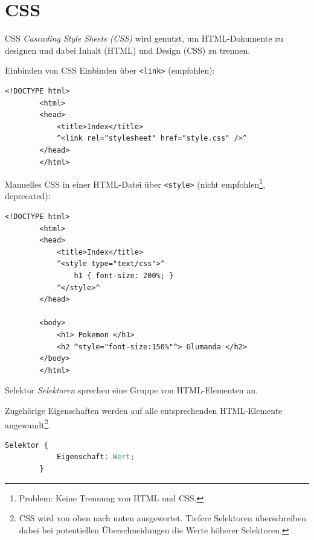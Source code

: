\section{CSS}

\begin{defi}{CSS}
    \emph{Cascading Style Sheets (CSS)} wird genutzt, um HTML-Dokumente zu designen und dabei Inhalt (HTML) und Design (CSS) zu trennen.
\end{defi}

\begin{example}{Einbinden von CSS}
    Einbinden über \texttt{<link>} (empfohlen):
    \begin{lstlisting}[language=html5]
        <!DOCTYPE html>
        <html>
        <head>
            <title>Index</title>
            ^<link rel="stylesheet" href="style.css" />^
        </head>
        </html>
    \end{lstlisting}

    Manuelles CSS in einer HTML-Datei über \texttt{<style>} (nicht empfohlen\footnote{Problem: Keine Trennung von HTML und CSS.}, deprecated):
    \begin{lstlisting}[language=html5]
        <!DOCTYPE html>
        <html>
        <head>
            <title>Index</title>
            ^<style type="text/css">^
                h1 { font-size: 200%; }
            ^</style>^
        </head>

        <body>
            <h1> Pokemon </h1>
            <h2 ^style="font-size:150%"^> Glumanda </h2>
        </body>
        </html>
    \end{lstlisting}
\end{example}

\begin{defi}{Selektor}
    \emph{Selektoren} sprechen eine Gruppe von HTML-Elementen an.

    Zugehörige Eigenschaften werden auf alle entsprechenden HTML-Elemente angewandt\footnote{
        CSS wird von oben nach unten ausgewertet.
        Tiefere Selektoren überschreiben dabei bei potentiellen Überschneidungen die Werte höherer Selektoren.
    }.

    \begin{lstlisting}[language=CSS]
        Selektor {
            Eigenschaft: Wert;
        }
    \end{lstlisting}
\end{defi}


